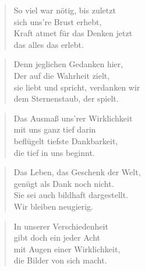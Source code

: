 \documentclass[10pt,a4paper]{article}
\begin{document}
\begin{multicols}{2}
\begin{verse}
So viel war nötig, bis zuletzt \\
sich uns’re Brust erhebt, \\
Kraft atmet für das Denken jetzt \\
das alles das erlebt. \\
\end{verse}

\begin{verse}
Denn jeglichen Gedanken hier, \\
Der auf die Wahrheit zielt, \\
sie liebt und spricht, verdanken wir \\
dem Sternenstaub, der spielt. \\
\end{verse}

\begin{verse}
Das Ausmaß uns’rer Wirklichkeit \\
mit uns ganz tief darin \\
beflügelt tiefste Dankbarkeit, \\
die tief in uns beginnt. \\
\end{verse}

\begin{verse}
Das Leben, das Geschenk der Welt, \\
genügt als Dank noch nicht. \\
Sie sei auch bildhaft dargestellt. \\
Wir bleiben neugierig. \\
\end{verse}

\begin{verse}
In unserer Verschiedenheit \\
gibt doch ein jeder Acht \\
mit Augen einer Wirklichkeit, \\
die Bilder von sich macht. \\
\end{verse}

\end{multicols}
\end{document}
